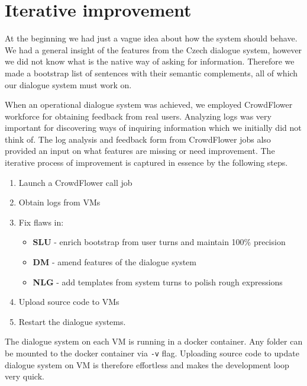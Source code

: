 \section{Iterative improvement}

At the beginning we had just a vague idea about how the system should behave.
We had a general insight of the features from the Czech dialogue system, however we did not know what is the native way of asking for information. %
Therefore we made a bootstrap list of sentences with their semantic complements, all of which our dialogue system must work on.

When an operational dialogue system was achieved, we employed CrowdFlower workforce for obtaining feedback from real users.
Analyzing logs was very important for discovering ways of inquiring information which we initially did not think of.
The log analysis and feedback form from CrowdFlower jobs also provided an input on what features are missing or need improvement.
The iterative process of improvement is captured in essence by the following steps. %

\begin{enumerate}
	\item Launch a CrowdFlower call job
	\item Obtain logs from \acp{VM}
	\item Fix flaws in:
	\begin{itemize}
		\item \textbf{\ac{SLU}} - enrich bootstrap from user turns and maintain 100\% precision
		\item \textbf{\ac{DM}} - amend features of the dialogue system
		\item \textbf{\ac{NLG}} - add templates from system turns to polish rough expressions
	\end{itemize}
	\item Upload source code to \acp{VM}
	\item Restart the dialogue systems.
\end{enumerate}


The dialogue system on each \ac{VM} is running in a docker container.
Any folder can be mounted to the docker container via \texttt{-v} flag.
Uploading source code to update dialogue system on \ac{VM} is therefore effortless and makes the development loop very quick.


